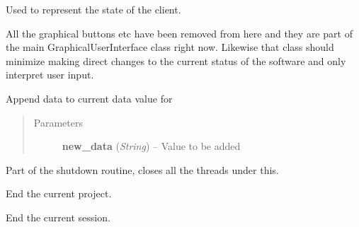 \documentclass[letterpaper,10pt,english]{sphinxmanual}
\begin{document}

\begin{fulllineitems}
\label{state:state.State}
Used to represent the state of the client.

All the graphical buttons etc have been removed from here and
they are part of the main GraphicalUserInterface class right now.
Likewise that class should minimize making direct changes to the
current status of the software and only interpret user input.

\begin{fulllineitems}
\label{state:state.State.append_swnp_data}
Append data to current data value for {\hyperref[swnp:swnp.Node]{}}
\begin{quote}\begin{description}
\item[{Parameters}] \leavevmode
\textbf{new\_data} (\emph{String}) -- Value to be added

\end{description}\end{quote}

\end{fulllineitems}


\begin{fulllineitems}
\label{state:state.State.destroy}
Part of the shutdown routine, closes all the threads under this.

\end{fulllineitems}


\begin{fulllineitems}
\label{state:state.State.end_current_project}
End the current project.

\end{fulllineitems}


\begin{fulllineitems}
\label{state:state.State.end_current_session}
End the current session.


\end{fulllineitems}
\end{fulllineitems}
\end{document}
